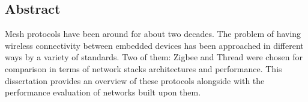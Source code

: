 
\vspace*{2cm}
\begin{addmargin}[1em]{1em}%
\hspace{8mm}
\begin{center}
\subsection*{Abstract}
\end{center}


Mesh protocols have been around for about two decades. The problem of having wireless connectivity between embedded 
devices has been approached in different ways by a variety of standards. Two of them: Zigbee and Thread were chosen
for comparison in terms of network stacks architectures and performance. This dissertation provides an overview of
these protocols alongside with the performance evaluation of networks built upon them. 

\end{addmargin}
\vspace{2cm}
\clearpage